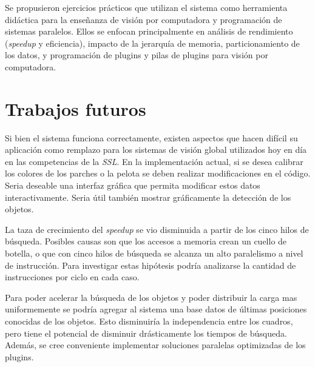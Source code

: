 Se propusieron ejercicios prácticos que utilizan el sistema como herramienta
didáctica para la enseñanza de visión por computadora y programación de sistemas
paralelos. Ellos se enfocan principalmente en análisis de rendimiento
(\emph{speedup} y eficiencia), impacto de la jerarquía de memoria,
particionamiento de los datos, y programación de plugins y pilas de plugins para
visión por computadora.

\section{Trabajos futuros}

\label{trabajosFuturos}

Si bien el sistema funciona correctamente, existen aspectos que hacen difícil su
aplicación como remplazo para los sistemas de visión global utilizados hoy en
día en las competencias de la \emph{SSL}. En la implementación actual, si se
desea calibrar los colores de los parches o la pelota se deben realizar
modificaciones en el código. Seria deseable una interfaz gráfica que permita
modificar estos datos interactivamente. Seria útil también mostrar gráficamente
la detección de los objetos.

La taza de crecimiento del \emph{speedup} se vio disminuida a partir de los cinco
hilos de búsqueda. Posibles causas son que los accesos a memoria crean un cuello
de botella, o que con cinco hilos de búsqueda se alcanza un alto paralelismo a
nivel de instrucción. Para investigar estas hipótesis podría analizarse la
cantidad de instrucciones por ciclo en cada caso.

Para poder acelerar la búsqueda de los objetos y poder distribuir la carga mas
uniformemente se podría agregar al sistema una base datos de últimas posiciones
conocidas de los objetos. Esto disminuiría la independencia entre los cuadros,
pero tiene el potencial de disminuir drásticamente los tiempos de búsqueda.
Además, se cree conveniente implementar soluciones paralelas optimizadas de los
plugins.


